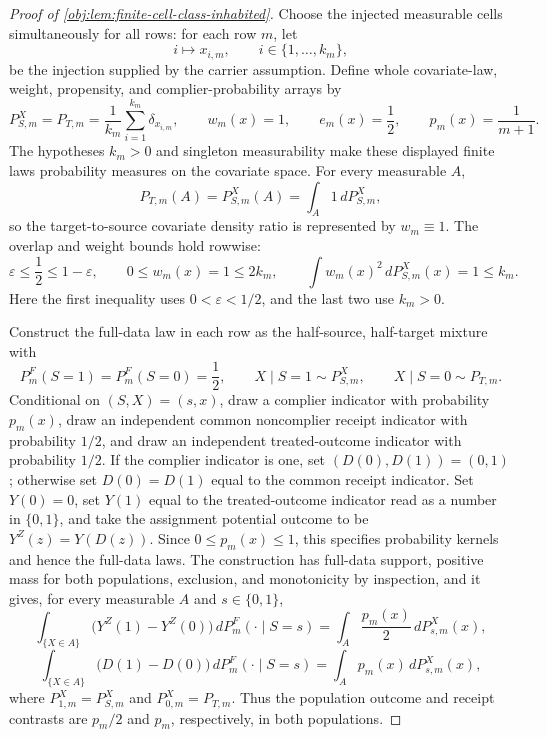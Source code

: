 \documentclass[11pt]{article}
\begin{document}
\begin{proof}[Proof of \cref{obj:lem:finite-cell-class-inhabited}]
Choose the injected measurable cells simultaneously for all rows: for each row
\(m\), let
\[
i\longmapsto x_{i,m},\qquad i\in\{1,\ldots,k_m\},
\]
be the injection supplied by the carrier assumption.  Define whole covariate-law,
weight, propensity, and complier-probability arrays by
\[
P_{S,m}^X=P_{T,m}
=
\frac1{k_m}\sum_{i=1}^{k_m}\delta_{x_{i,m}},
\qquad
w_m(x)=1,
\qquad
e_m(x)=\frac12,
\qquad
p_m(x)=\frac1{m+1}.
\]
The hypotheses \(k_m>0\) and singleton measurability make these displayed
finite laws probability measures on the covariate space.  For every measurable
\(A\),
\[
P_{T,m}(A)=P_{S,m}^X(A)=\int_A 1\,dP_{S,m}^X,
\]
so the target-to-source covariate density ratio is represented by
\(w_m\equiv1\).  The overlap and weight bounds hold rowwise:
\[
\varepsilon\le \frac12\le 1-\varepsilon,
\qquad
0\le w_m(x)=1\le 2k_m,
\qquad
\int w_m(x)^2\,dP_{S,m}^X(x)=1\le k_m .
\]
Here the first inequality uses \(0<\varepsilon<1/2\), and the last two use
\(k_m>0\). %

Construct the full-data law in each row as the half-source, half-target mixture
with
\[
P_m^F(S=1)=P_m^F(S=0)=\frac12,
\qquad
X\mid S=1\sim P_{S,m}^X,
\qquad
X\mid S=0\sim P_{T,m}.
\]
Conditional on \((S,X)=(s,x)\), draw a complier indicator with probability
\(p_m(x)\), draw an independent common noncomplier receipt indicator with
probability \(1/2\), and draw an independent treated-outcome indicator with
probability \(1/2\).  If the complier indicator is one, set
\((D(0),D(1))=(0,1)\); otherwise set \(D(0)=D(1)\) equal to the common receipt
indicator.  Set \(Y(0)=0\), set \(Y(1)\) equal to the treated-outcome indicator
read as a number in \(\{0,1\}\), and take the assignment potential outcome to be
\(Y^Z(z)=Y(D(z))\).  Since \(0\le p_m(x)\le1\), this specifies probability
kernels and hence the full-data laws.  The construction has full-data support,
positive mass for both populations, exclusion, and monotonicity by inspection,
and it gives, for every measurable \(A\) and \(s\in\{0,1\}\),
\[
\int_{\{X\in A\}}\!\bigl(Y^Z(1)-Y^Z(0)\bigr)\,dP_m^F(\cdot\mid S=s)
=
\int_A \frac{p_m(x)}2\,dP_{s,m}^X(x),
\]
\[
\int_{\{X\in A\}}\!\bigl(D(1)-D(0)\bigr)\,dP_m^F(\cdot\mid S=s)
=
\int_A p_m(x)\,dP_{s,m}^X(x),
\]
where \(P_{1,m}^X=P_{S,m}^X\) and \(P_{0,m}^X=P_{T,m}\).  Thus the population
outcome and receipt contrasts are \(p_m/2\) and \(p_m\), respectively, in both
populations. %


\end{proof}
\end{document}
